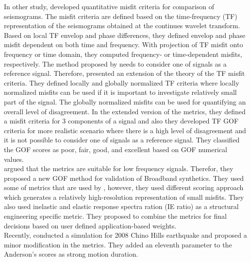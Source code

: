 In other study, \citet{Kristekova_2006_BSSA} developed quantitative misfit criteria for comparison of seismograms. The misfit criteria are defined based on the time-frequency (TF) representation of the seismograms obtained at the continues wavelet transform. Based on local TF envelop and phase differences, they defined envelop and phase misfit dependent on both time and frequency. With projection of TF misfit onto frequency or time domain, they computed frequency- or time-dependent misfits, respectively. The method proposed  by \citet{Kristekova_2006_BSSA} needs to consider one of signals as a reference signal. Therefore, \citet{Kristekova_2009_GJI} presented an extension of the theory of the TF misfit criteria. They defined locally and globally normalized TF criteria where locally normalized misfits can be used if it is important to investigate relatively small part of the signal. The globally normalized misfits can be used for quantifying an overall level of disagreement. In the extended version of the metrics, they defined a misfit criteria for 3 components of a signal and also they developed TF GOF criteria for more realistic scenario where there is a high level of disagreement and it is not possible to consider one of signals as a reference signal. They classified the GOF scores as poor, fair, good, and excellent based on GOF numerical values.\\

\citet{Olsen_2010_SRL} argued that the \citet{Kristekova_2006_BSSA,Kristekova_2009_GJI}  metrics are suitable for low frequency signals. Therefor, they proposed a new GOF method for validation of Broadband synthetics. They used some of metrics that are used by \citet{Anderson_2004_Proc}, however, they used different scoring approach which generates a relatively high-resolution representation of small misfits. They also used inelastic and elastic response spectra ration (IE ratio) as a structural engineering specific metric. They proposed to combine the metrics for final decisions based on user defined application-based weights.\\

Recently, \citet{Taborda_2013_BSSA} conducted a simulation for 2008 Chino Hills earthquake and proposed a minor modification in the \citet{Anderson_2004_Proc} metrics. They added an eleventh parameter to the Anderson's scores as strong motion duration.\\


